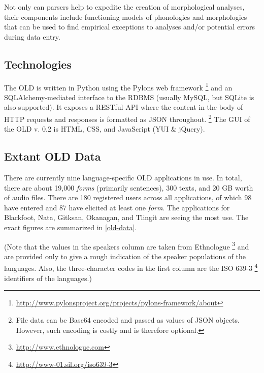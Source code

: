 \documentclass[11pt]{article}
\begin{document}
Not only can parsers help to expedite the creation of morphological analyses,
their components include functioning models of phonologies and morphologies that
can be used to find empirical exceptions to analyses and/or potential errors
during data entry.


\subsection{Technologies}

The OLD is written in Python using the Pylons web framework%
\footnote{\url{http://www.pylonsproject.org/projects/pylons-framework/about}} %
and an SQLAlchemy-mediated interface to the RDBMS (usually MySQL, but SQLite is also
supported). It exposes a RESTful API where the content in the body of HTTP 
requests and responses is formatted as JSON throughout.%
\footnote{File data can be Base64 encoded and passed as values of JSON objects.
However, such encoding is costly and is therefore optional.} %
The GUI of the OLD v. 0.2 is HTML, CSS, and JavaScript (YUI \& jQuery).


\subsection{Extant OLD Data}

There are currently nine language-specific OLD applications in use. In total,
there are about 19,000 \emph{forms} (primarily sentences), 300 texts, and 20 GB worth
of audio files.  There are 180 registered users across all applications, of
which 98 have entered and 87 have elicited at least one \emph{form}. The applications
for Blackfoot, Nata, Gitksan, Okanagan, and Tlingit are seeing the most use. The
exact figures are summarized in \autoref{old-data}.

(Note that the values in the speakers column are taken from Ethnologue%
\footnote{\url{http://www.ethnologue.com}} %
and are provided only to give a rough indication of the speaker populations of
the languages. Also, the three-character codes in the first column are the ISO
639-3%
\footnote{\url{http://www-01.sil.org/iso639-3}} %
identifiers of the languages.)
\end{document}
